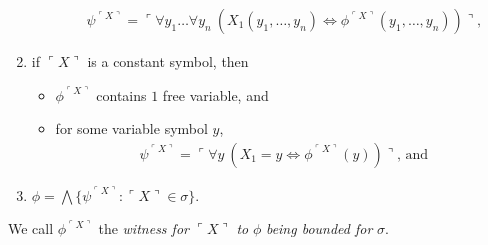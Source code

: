 \documentclass[12pt]{article}
\numberwithin{equation}{section}
\begin{document}
\begin{defi}
\begin{enumerate}[label=(\alph*)]
\begin{itemize}[label=$\circ$, leftmargin=20pt]
\begin{align*}
            \psi^{\ulcorner X \urcorner} = \ulcorner \forall y_1 \dots \forall y_n \ (X_1(y_1, \dots, y_n) \iff \phi^{\ulcorner X \urcorner}(y_1, \dots, y_n)) \urcorner \text{,}
        \end{align*}
    \end{itemize}
    \item if $\ulcorner X \urcorner$ is a constant symbol, then 
    \begin{itemize}[label=$\circ$, leftmargin=20pt]
        \item $\phi^{\ulcorner X \urcorner}$ contains $1$ free variable, and
        \item for some variable symbol $y$,
        \begin{align*}
            \psi^{\ulcorner X \urcorner} = \ulcorner \forall y \ (X_1 = y \iff \phi^{\ulcorner X \urcorner}(y)) \urcorner \text{, and}
        \end{align*}
    \end{itemize}
    \item $\phi = \bigwedge \{\psi^{\ulcorner X \urcorner} : \ulcorner X \urcorner \in \sigma\}$.
\end{enumerate}
We call $\phi^{\ulcorner X \urcorner}$ the \emph{witness for} $\ulcorner X \urcorner$ \emph{to} $\phi$ \emph{being bounded for} $\sigma$.
\end{defi}
\end{document}
